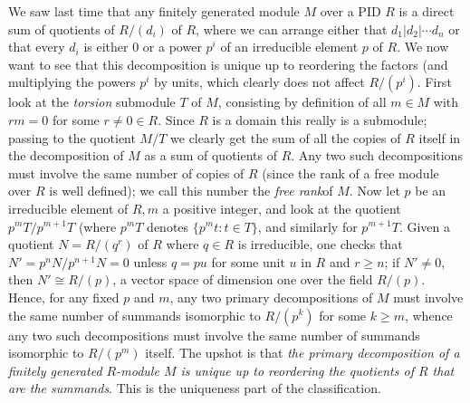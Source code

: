 We saw last time that any finitely generated module $M$ over a PID $R$ is a direct sum of quotients of $R/(d_i)$ of $R$, where we can arrange either that $d_1 | d_2 | \cdots d_n$ or that every $d_i$ is either 0 or a power $p^i$ of an irreducible element $p$ of $R$.  We now want to see that this decomposition is unique up to reordering the factors (and multiplying the powers $p^i$ by units, which clearly does not affect $R/(p^i)$.  First look at the {\sl torsion} submodule $T$ of $M$, consisting by definition of all $m\in M$ with $rm = 0 $ for some $r\ne0\in R$.  Since $R$ is a domain this really is a submodule; passing to the quotient $M/T$ we clearly get the sum of all the copies of $R$ itself in the decomposition of $M$ as a sum of quotients of $R$.  Any two such decompositions must involve the same number of copies of $R$ (since the rank of a free module over $R$ is well defined); we call this number the {\sl free rank}of $M$.  Now let $p$ be an irreducible element of $R, m$ a positive integer, and look at the quotient $p^m T/p^{m+1}T$ (where $p^m T$ denotes $\{p^m t: t\in T\}$, and similarly for $p^{m+1} T$.  Given a quotient $N = R/(q^r)$ of $R$ where $q\in R$ is irreducible, one checks that 
$N'=p^n N/p^{n+1} N = 0$ unless $q = pu$ for some unit $u$ in $R$ and $r\ge n$; if $N'\ne0$, then
$N'\cong R/(p)$, a vector space of dimension one over the field $R/(p)$.  Hence, for any fixed $p$ and $m$, any two primary decompositions of $M$ must involve the same number of summands isomorphic to $R/(p^k)$ for some $k\ge m$, whence any two such decompositions must involve the same number of summands isomorphic to $R/(p^m)$ itself.  The upshot is that {\sl the primary decomposition of a finitely generated $R$-module $M$ is unique up to reordering the quotients of $R$ that are the summands}.  This is the uniqueness part of the classification.

